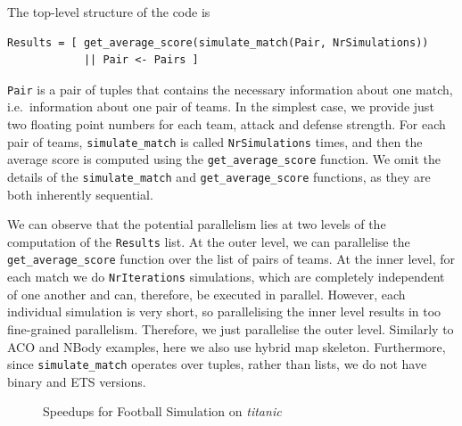 \documentclass[final]{jfp1}
\begin{document}
The top-level structure of the code is

\begin{lstlisting}
Results = [ get_average_score(simulate_match(Pair, NrSimulations)) 
            || Pair <- Pairs ]
\end{lstlisting}

\noindent
\lstinline{Pair} is a pair of tuples that contains the necessary information 
about one match, i.e.\ 
information about one pair of teams. In the simplest case, we provide just
two floating point numbers for each team, attack and defense strength.
For each pair of teams, \lstinline{simulate_match}
is called \lstinline{NrSimulations} times, and then the average score is computed
using the \lstinline{get_average_score} function. We omit the details of
the \lstinline{simulate_match} and \lstinline{get_average_score} functions, as
they are both inherently sequential.

We can observe that the potential parallelism lies at two levels of the
computation of the \lstinline{Results} list. 
At the outer level, we can parallelise the
\lstinline{get_average_score} function over the list of 
pairs of teams. At the inner level, for each match we do
\lstinline{NrIterations} simulations, which are completely independent of one
another and can, therefore, be executed in parallel. However, each individual
simulation is very short, so parallelising the inner level results in too 
fine-grained parallelism. Therefore, we just parallelise the outer level. Similarly
to ACO and NBody examples, here we also use hybrid map skeleton. Furthermore, since
\lstinline{simulate_match} operates over tuples, rather than lists, we do not
have binary and ETS versions.

\begin{figure}[t]
\centering
{}
 \caption{Speedups for Football Simulation on \emph{titanic}}
 \label{fig:FootballSimSpeedups}
\end{figure}
\end{document}
